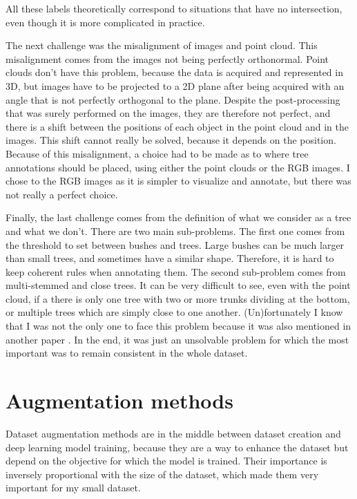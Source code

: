 \documentclass[
]{report}
\begin{document}
All these labels theoretically correspond to situations that have no
intersection, even though it is more complicated in practice.

The next challenge was the misalignment of images and point cloud. This
misalignment comes from the images not being perfectly orthonormal.
Point clouds don't have this problem, because the data is acquired and
represented in 3D, but images have to be projected to a 2D plane after
being acquired with an angle that is not perfectly orthogonal to the
plane. Despite the post-processing that was surely performed on the
images, they are therefore not perfect, and there is a shift between the
positions of each object in the point cloud and in the images. This
shift cannot really be solved, because it depends on the position.
Because of this misalignment, a choice had to be made as to where tree
annotations should be placed, using either the point clouds or the RGB
images. I chose to the RGB images as it is simpler to visualize and
annotate, but there was not really a perfect choice.

Finally, the last challenge comes from the definition of what we
consider as a tree and what we don't. There are two main sub-problems.
The first one comes from the threshold to set between bushes and trees.
Large bushes can be much larger than small trees, and sometimes have a
similar shape. Therefore, it is hard to keep coherent rules when
annotating them. The second sub-problem comes from multi-stemmed and
close trees. It can be very difficult to see, even with the point cloud,
if a there is only one tree with two or more trunks dividing at the
bottom, or multiple trees which are simply close to one another.
(Un)fortunately I know that I was not the only one to face this problem
because it was also mentioned in another paper
\autocite{DeepForestBefore}. In the end, it was just an unsolvable
problem for which the most important was to remain consistent in the
whole dataset.

\section{Augmentation methods}\label{augmentation-methods}

Dataset augmentation methods are in the middle between dataset creation
and deep learning model training, because they are a way to enhance the
dataset but depend on the objective for which the model is trained.
Their importance is inversely proportional with the size of the dataset,
which made them very important for my small dataset.
\end{document}
